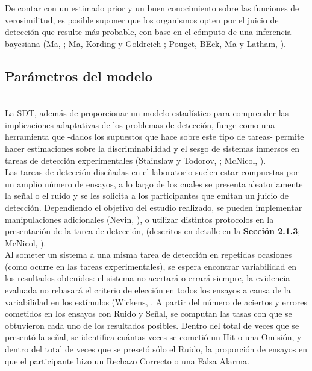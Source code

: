 De contar con un estimado prior y un buen conocimiento sobre las funciones de verosimilitud, es posible suponer que los organismos opten por el juicio de detección que resulte más probable, con base en el cómputo de una inferencia bayesiana (Ma, \citeyear{WeijiMa}; Ma, Kording y Goldreich \citeyear{WeijiMa2012}; Pouget, BEck, Ma y Latham, \citeyear{Pouget2013}).\\

\subsection{Parámetros del modelo}\\

La SDT, además de proporcionar un modelo estadístico para comprender las implicaciones adaptativas de los problemas de detección, funge como una herramienta que -dados los supuestos que hace sobre este tipo de tareas- permite hacer estimaciones sobre la discriminabilidad y el sesgo de sistemas inmersos en tareas de detección experimentales (Stainslaw y Todorov, \citeyear{Stainslaw1999}; McNicol, \citeyear{McNicol1}).\\

Las tareas de detección diseñadas en el laboratorio suelen estar compuestas por un amplio número de ensayos, a lo largo de los cuales se presenta aleatoriamente la señal o el ruido y se les solicita a los participantes que emitan un juicio de detección. Dependiendo el objetivo del estudio realizado, se pueden implementar manipulaciones adicionales (Nevin, \citeyear{Nevin1969}), o utilizar distintos protocolos en la presentación de la tarea de detección, (descritos en detalle en la \textbf{Sección 2.1.3}; McNicol, \citeyear{McNicol2}).\\

Al someter un sistema a una misma tarea de detección en repetidas ocasiones (como ocurre en las tareas experimentales), se espera encontrar variabilidad en los resultados obtenidos: el sistema no acertará o errará siempre, la evidencia evaluada no rebasará el criterio de elección en todos los ensayos a causa de la variabilidad en los estímulos (Wickens, \citeyear{Wickens1}. A partir del número de aciertos y errores cometidos en los ensayos con Ruido y Señal, se computan las tasas con que se obtuvieron cada uno de los resultados posibles. Dentro del total de veces que se presentó la señal, se identifica cuántas veces se cometió un Hit o una Omisión, y dentro del total de veces que se presetó sólo el Ruido, la proporción de ensayos en que el participante hizo un Rechazo Correcto o una Falsa Alarma.\\

